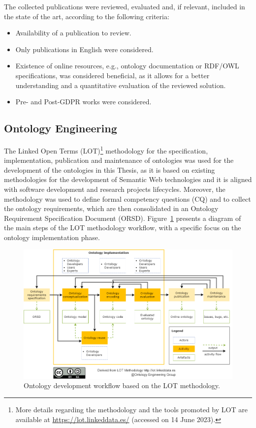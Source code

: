 The collected publications were reviewed, evaluated and, if relevant, included in the state of the art, according to the following criteria:

\begin{itemize}
\item Availability of a publication to review.
\item Only publications in English were considered.
\item Existence of online resources, e.g., ontology documentation or RDF/OWL specifications, was considered beneficial, as it allows for a better understanding and a quantitative evaluation of the reviewed solution.
\item Pre- and Post-GDPR works were considered.
\end{itemize}

\subsection{Ontology Engineering}
\label{sec:ontology_engineering}

The Linked Open Terms (LOT)\footnote{More details regarding the methodology and the tools promoted by LOT are available at \url{https://lot.linkeddata.es/} (accessed on 14 June 2023).} methodology for the specification, implementation, publication and maintenance of ontologies \citep{poveda-villalon_lot_2022} was used for the development of the ontologies in this Thesis, as it is based on existing methodologies for the development of Semantic Web technologies and it is aligned with software development and research projects lifecycles.
Moreover, the \cite{suarez-figueroa_neon_2012} methodology was used to define formal competency questions (CQ) and to collect the ontology requirements, which are then consolidated in an Ontology Requirement Specification Document (ORSD).
Figure~\ref{fig:lot} presents a diagram of the main steps of the LOT methodology workflow, with a specific focus on the ontology implementation phase.

\begin{figure}
    \centering
    \includegraphics[width=\linewidth]{figures/chapter-3/LOT.png}
    \caption{Ontology development workflow based on the LOT methodology.}
    \label{fig:lot}
\end{figure}

